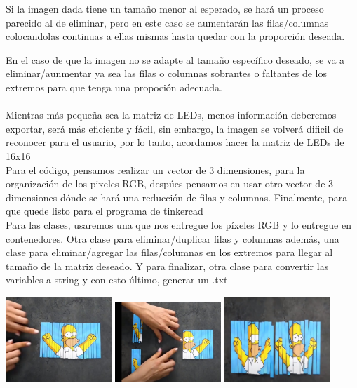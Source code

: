 \documentclass{article}
\begin{document}
Si la imagen dada tiene un tamaño menor al esperado, se hará un proceso parecido al de eliminar, pero en este caso se aumentarán las filas/columnas colocandolas continuas a ellas mismas  hasta quedar con la proporción deseada.

En el caso de que la imagen no se adapte al tamaño específico deseado, se va a eliminar/aunmentar ya sea las filas o columnas sobrantes o faltantes de los extremos para que tenga una propoción adecuada.\\
\\Mientras más pequeña sea la matriz de LEDs, menos información deberemos exportar, será más eficiente y fácil, sin embargo, la imagen se volverá dificil de reconocer para el usuario, por lo tanto, acordamos hacer la matriz de LEDs de 16x16\\

Para el código, pensamos realizar un vector de 3 dimensiones, para la organización de los pixeles RGB, despúes pensamos en usar otro vector de 3 dimensiones dónde se hará una reducción de filas y columnas. Finalmente, para que quede listo para el programa de tinkercad \\

Para las clases, usaremos una que nos entregue los píxeles RGB y lo entregue en contenedores. Otra clase para eliminar/duplicar filas y columnas además, una clase para eliminar/agregar las filas/columnas en los extremos para llegar al tamaño de la matriz deseado. Y para finalizar, otra clase para convertir las variables a string y con esto último, generar un .txt


\includegraphics[width=4cm]{Imagenes/recorte1.jpeg}
\includegraphics[width=4cm]{Imagenes/recorte2.jpeg}
\includegraphics[width=4cm]{Imagenes/recorte3.jpeg}
\vspace{0,3cm}
\end{document}
